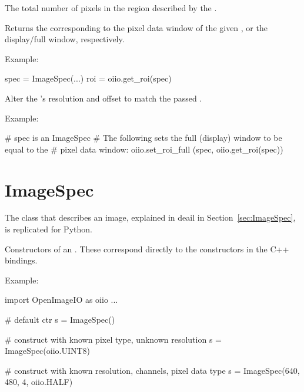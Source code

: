 The total number of pixels in the region described by the \ROI.
\apiend


Returns the \ROI corresponding to the pixel data window of the given
\ImageSpec, or the display/full window, respectively.

\noindent Example:
\begin{code}
    spec = ImageSpec(...)
    roi = oiio.get_roi(spec)
\end{code}
\apiend

Alter the \ImageSpec's resolution and offset to match the passed \ROI.

\noindent Example:
\begin{code}
    # spec is an ImageSpec
    # The following sets the full (display) window to be equal to the
    # pixel data window:
    oiio.set_roi_full (spec, oiio.get_roi(spec))
\end{code}
\apiend


\section{ImageSpec}
\label{sec:pythonimagespec}

The \ImageSpec class that describes an image, explained in deail in
Section~\ref{sec:ImageSpec}, is replicated for Python.

Constructors of an \ImageSpec. These correspond directly to the constructors
in the C++ bindings.

\noindent Example:
\begin{code}
    import OpenImageIO as oiio
    ...

    # default ctr
    s = ImageSpec()

    # construct with known pixel type, unknown resolution
    s = ImageSpec(oiio.UINT8)

    # construct with known resolution, channels, pixel data type
    s = ImageSpec(640, 480, 4, oiio.HALF)
\end{code}
\apiend

